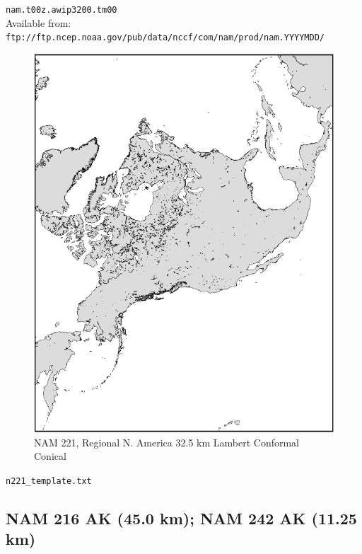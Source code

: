 \documentclass[11pt]{article}   %
\begin{document}
\verb|nam.t00z.awip3200.tm00|\\
Available from:\\
\verb|ftp://ftp.ncep.noaa.gov/pub/data/nccf/com/nam/prod/nam.YYYYMDD/| \\

\begin{figure}[htbp]\begin{center}
 \includegraphics[angle=-90,scale=1.0]{Figs/n221.pdf}
\parbox{15cm}{\caption{\label{FigNAM221}
NAM 221, Regional N. America 32.5 km Lambert Conformal Conical
}}
\end{center}\end{figure}
\clearpage
\verb|n221_template.txt| \\
\tiny  \normalsize


\clearpage
\subsection{NAM 216 AK (45.0 km); NAM 242 AK (11.25 km)}
\end{document}
